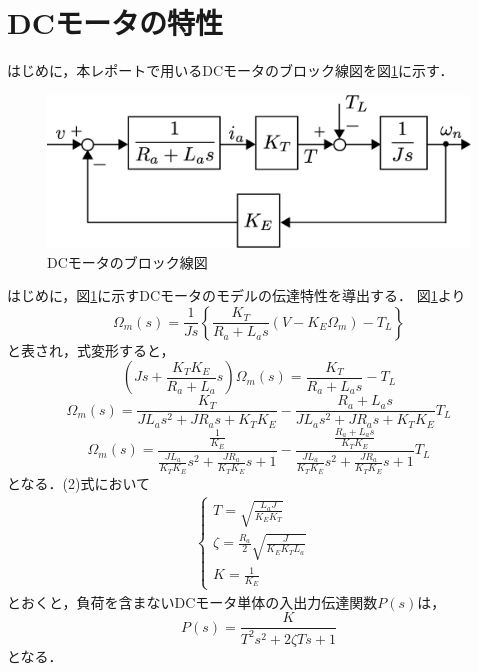 \documentclass[a4paper,12pt]{jarticle}
\begin{document}
\section{DCモータの特性}
はじめに，本レポートで用いるDCモータのブロック線図を図\ref{fig:DC_model}に示す．
%
\begin{figure}[bp]
 \begin{center}
  \includegraphics[width = 150mm]{fig/DC_model.eps}
 \end{center}
 \caption{DCモータのブロック線図}
 \label{fig:DC_model}
\end{figure}
%
\newpage
%
はじめに，図\ref{fig:DC_model}に示すDCモータのモデルの伝達特性を導出する．
図\ref{fig:DC_model}より
%
\begin{equation}
 \Omega_m(s)=\frac{1}{Js}\left\{\frac{K_T}{R_{a}+L_{a}s}(V-K_E\Omega_m)-T_L\right\}
\end{equation}
と表され，式変形すると，
\begin{equation*}
 \left(Js+\frac{K_{T}K_{E}}{R_{a}+L_{a}}s\right)\Omega_m(s)=\frac{K_{T}}{R_{a}+L_{a}s}-T_L
\end{equation*}
%
\begin{equation*}
 \Omega_m(s)=\frac{K_T}{JL_{a}s^2+JR_{a}s+K_TK_E}-\frac{R_{a}+L_{a}s}{JL_{a}s^2+JR_{a}s+K_TK_E}T_L
\end{equation*}
%
\begin{equation}
 \Omega_m(s)=\frac{\frac{1}{K_E}}{\frac{JL_a}{K_{T}K_E}s^2+\frac{JR_a}{K_{T}K_E}s+1}-\frac{\frac{R_{a}+L_{a}s}{K_{T}K_E}}{\frac{JL_a}{K_{T}K_E}s^2+\frac{JR_a}{K_{T}K_E}s+1}T_L
\end{equation}
%
となる．(2)式において
\begin{eqnarray}
 \begin{cases}
  T = \sqrt{\frac{L_{a}J}{K_{E}K_T}} & \\
  \zeta= \frac{R_a}{2}\sqrt{\frac{J}{K_{E}K_{T}L_a}} & \\
  K = \frac{1}{K_E}
 \end{cases}
\end{eqnarray}
とおくと，負荷を含まないDCモータ単体の入出力伝達関数$P(s)$は，
\begin{equation}\label{equ:plant}
 P(s)=\frac{K}{T^2s^2+2\zeta Ts+1}
\end{equation}
となる\cite{mecha}．
%
\newpage
\end{document}
